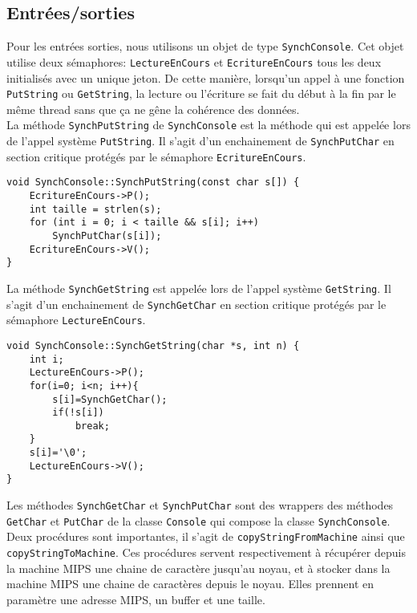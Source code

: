 \documentclass{report}
\begin{document}
\subsection*{Entrées/sorties}
Pour les entrées sorties, nous utilisons un objet de type \texttt{SynchConsole}. Cet objet utilise deux sémaphores: \texttt{LectureEnCours} et \texttt{EcritureEnCours} tous les deux initialisés avec un unique jeton. De cette manière, lorsqu'un appel à une fonction \texttt{PutString} ou \texttt{GetString}, la lecture ou l'écriture se fait du début à la fin par le même thread sans que ça ne gêne la cohérence des données.\\

La méthode \texttt{SynchPutString} de \texttt{SynchConsole} est la méthode qui est appelée lors de l'appel système \texttt{PutString}. Il s'agit d'un enchainement de \texttt{SynchPutChar} en section critique protégés par le sémaphore \texttt{EcritureEnCours}.
\begin{verbatim}
void SynchConsole::SynchPutString(const char s[]) {
    EcritureEnCours->P();
    int taille = strlen(s);
    for (int i = 0; i < taille && s[i]; i++)
        SynchPutChar(s[i]);
    EcritureEnCours->V();
}
\end{verbatim}

La méthode \texttt{SynchGetString} est appelée lors de l'appel système \texttt{GetString}. Il s'agit d'un enchainement de \texttt{SynchGetChar} en section critique protégés par le sémaphore \texttt{LectureEnCours}.
\begin{verbatim}
void SynchConsole::SynchGetString(char *s, int n) {
    int i;
    LectureEnCours->P();
    for(i=0; i<n; i++){
        s[i]=SynchGetChar();
        if(!s[i])
            break;
    }
    s[i]='\0';
    LectureEnCours->V();
}
\end{verbatim}

Les méthodes \texttt{SynchGetChar} et \texttt{SynchPutChar} sont des wrappers des méthodes \texttt{GetChar} et \texttt{PutChar} de la classe \texttt{Console} qui compose la classe \texttt{SynchConsole}.\\

Deux procédures sont importantes, il s'agit de \texttt{copyStringFromMachine} ainsi que \texttt{copyStringToMachine}. Ces procédures servent respectivement à récupérer depuis la machine MIPS une chaine de caractère jusqu'au noyau, et à stocker dans la machine MIPS une chaine de caractères depuis le noyau. Elles prennent en paramètre une adresse MIPS, un buffer et une taille.\\
\end{document}
